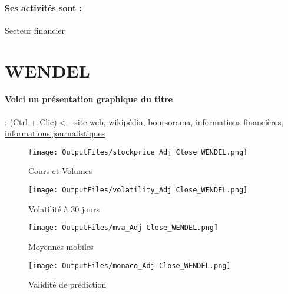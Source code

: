 \documentclass[11pt,a4paper]{report}%
\begin{document}
\paragraph{Ses activités sont : } Secteur financier 
    
    \newpage

\section{WENDEL}

\paragraph{Voici un présentation graphique du titre} : (Ctrl + Clic)$<-$\href{https://www.wendelgroup.com/fr/resultats}{site web}, \href{https://fr.wikipedia.org/wiki/Wendel_(entreprise)}{wikipédia}, \href{https://www.boursorama.com/cours/1rPMF}{boursorama}, \href{https://www.qwant.com/?q=site:https:%2f%2fwww.easybourse.com%2faction-societe%2fWENDEL&t=web&client=ext-firefox-hp}{informations financières}, \href{https://bourse.lerevenu.com/cours-de-bourse/fiche-valeur-synthese/WENDEL/MF-FR}{informations journalistiques}
\begin{figure}[!htb]
   \begin{minipage}{0.5\textwidth}
     \centering
     \texttt{[image: OutputFiles/stockprice\_Adj Close\_WENDEL.png]}
     \caption{Cours et Volumes}\label{Fig:price_WENDEL}
   \end{minipage}\hfill
   \begin{minipage}{0.5\textwidth}
     \centering
     \texttt{[image: OutputFiles/volatility\_Adj Close\_WENDEL.png]}
     \caption{Volatilité à 30 jours}\label{Fig:volat_WENDEL}
   \end{minipage}
\end{figure}
\begin{figure}[!htb]
   \begin{minipage}{0.5\textwidth}
     \centering
     \texttt{[image: OutputFiles/mva\_Adj Close\_WENDEL.png]}
     \caption{Moyennes mobiles}\label{Fig:mva_WENDEL}
   \end{minipage}\hfill
   \begin{minipage}{0.5\textwidth}
     \centering
     \texttt{[image: OutputFiles/monaco\_Adj Close\_WENDEL.png]}
     \caption{Validité de prédiction}\label{Fig:prediction_WENDEL}
   \end{minipage}
\end{figure}
\end{document}

